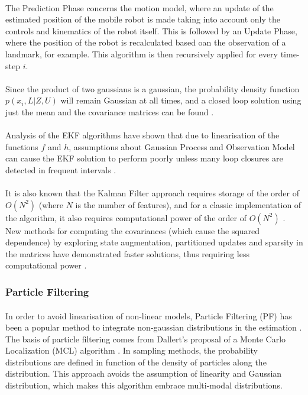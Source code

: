 \documentclass[12pt]{article}
\begin{document}
	\paragraph{}
	The Prediction Phase concerns the motion model, where an update of the estimated position of the mobile robot is made taking into account only the controls and kinematics of the robot itself. This is followed by an Update Phase, where the position of the robot is recalculated based oan the observation of a landmark, for example. This algorithm is then recursively applied for every time-step $i$. 	
	\paragraph{}	 
	 Since the product of two gaussians is a gaussian, the probability density function $p(x_i, L|Z, U)$ will remain Gaussian at all times, and a closed loop solution using just the mean and the covariance matrices can be found \cite{772544}.
	\paragraph{}	
	 Analysis of the EKF algorithms have shown that due to linearisation of the functions $f$ and $h$, assumptions about Gaussian Process and Observation Model can cause the EKF solution to perform poorly unless many loop closures are detected in frequent intervals \cite{doi:10.1177/1729881416669482}.


	\paragraph{}
	It is also known that the Kalman Filter approach requires storage of the order of $O(N^2)$ (where $N$ is the number of features), and for a classic implementation of the algorithm, it also requires computational power of the order of $O(N^2)$ \cite{CsorbaThesis}. New methods for computing the covariances (which cause the squared dependence) by exploring state augmentation, partitioned updates and sparsity in the matrices have demonstrated faster solutions, thus requiring less computational power \cite{SLAMPartII}.

	\subsubsection{Particle Filtering}
	\paragraph{} 
	In order to avoid linearisation of non-linear models, Particle Filtering (PF) has been a popular method to integrate non-gaussian distributions in the estimation \cite{Montemerlo02fastslam:a}\cite{772544}. The basis of particle filtering comes from Dallert's proposal of a Monte Carlo Localization (MCL) algorithm \cite{772544}. In sampling methods, the probability distributions are defined in function of the density of particles along the distribution. This approach avoids the assumption of linearity and Gaussian distribution, which makes this algorithm embrace multi-modal distributions.
	
\end{document}
